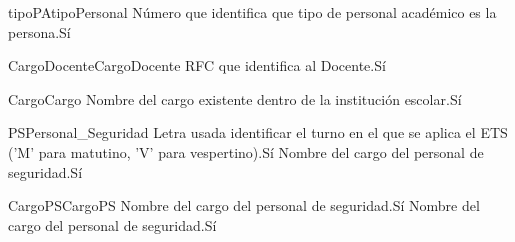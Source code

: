 \begin{cdtEntidad}{tipoPA}{tipoPersonal}
	{Número que identifica que tipo de personal académico es la persona.}{Sí}
\end{cdtEntidad}
\begin{cdtEntidad}{CargoDocente}{CargoDocente}
	{RFC que identifica al Docente.}{Sí}
\end{cdtEntidad}
\begin{cdtEntidad}{Cargo}{Cargo}
	{Nombre del cargo existente dentro de la institución escolar.}{Sí}
\end{cdtEntidad}
\begin{cdtEntidad}{PS}{Personal\_Seguridad}
	{Letra usada identificar el turno en el que se aplica el ETS ('M' para matutino, 'V' para vespertino).}{Sí}
	{Nombre del cargo del personal de seguridad.}{Sí}
	\cdtEntityRelSection
\end{cdtEntidad}
\begin{cdtEntidad}{CargoPS}{CargoPS}
	{Nombre del cargo del personal de seguridad.}{Sí}
	{Nombre del cargo del personal de seguridad.}{Sí}
\end{cdtEntidad}
